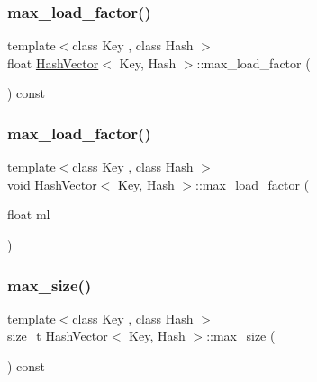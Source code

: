\mbox{\label{class_hash_vector_a9c77cbee1053243f3019d1f013cedfc8}} 
\subsubsection{\texorpdfstring{max\+\_\+load\+\_\+factor()}{max\_load\_factor()}\hspace{0.1cm}{\footnotesize\ttfamily [1/2]}}
{\footnotesize\ttfamily template$<$class Key , class Hash $>$ \\
float \mbox{\hyperlink{class_hash_vector}{Hash\+Vector}}$<$ Key, Hash $>$\+::max\+\_\+load\+\_\+factor (\begin{DoxyParamCaption}{ }\end{DoxyParamCaption}) const}

\mbox{\label{class_hash_vector_a1bc6e963cddf7301a90dea11de9f0235}} 
\subsubsection{\texorpdfstring{max\+\_\+load\+\_\+factor()}{max\_load\_factor()}\hspace{0.1cm}{\footnotesize\ttfamily [2/2]}}
{\footnotesize\ttfamily template$<$class Key , class Hash $>$ \\
void \mbox{\hyperlink{class_hash_vector}{Hash\+Vector}}$<$ Key, Hash $>$\+::max\+\_\+load\+\_\+factor (\begin{DoxyParamCaption}\item[{float}]{ml }\end{DoxyParamCaption})}

\mbox{\label{class_hash_vector_a8a46270688ee2d936c131546487882cc}} 
\subsubsection{\texorpdfstring{max\+\_\+size()}{max\_size()}}
{\footnotesize\ttfamily template$<$class Key , class Hash $>$ \\
size\+\_\+t \mbox{\hyperlink{class_hash_vector}{Hash\+Vector}}$<$ Key, Hash $>$\+::max\+\_\+size (\begin{DoxyParamCaption}{ }\end{DoxyParamCaption}) const}

